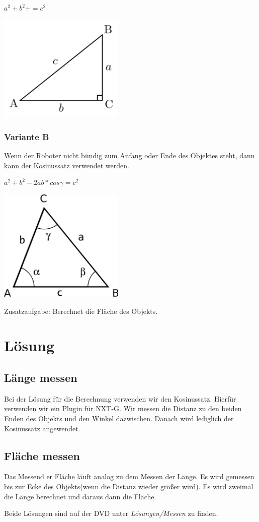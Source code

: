 $a^2 + b^2 + = c^2$

\begin{capfigure}[Pythagoras]
	\includegraphics[width=6cm]{images/pythagoras.png}
\end{capfigure}

\clearpage
\subsubsection{Variante B}
Wenn der Roboter nicht bündig zum Anfang oder Ende des Objektes steht, dann kann der Kosinussatz verwendet werden.

$a^2 + b^2 - 2ab*cos\gamma = c^2$

\begin{capfigure}[Kosinussatz]
	\includegraphics[width=6cm]{images/kosinus.png}
\end{capfigure}

Zusatzaufgabe: Berechnet die Fläche des Objekts.

\section{Lösung}
\subsection{Länge messen}
Bei der Lösung für die Berechnung verwenden wir den Kosinussatz. Hierfür verwenden wir ein Plugin für NXT-G. Wir messen die Distanz zu den beiden Enden des Objekts und den Winkel dazwischen. Danach wird lediglich der Kosinussatz angewendet.

\subsection{Fläche messen}
Das Messend er Fläche läuft analog zu dem Messen der Länge. Es wird gemessen bis zur Ecke des Objekts(wenn die Distanz wieder größer wird). Es wird zweimal die Länge berechnet und daraus dann die Fläche.

Beide Lösungen sind auf der DVD unter \textit{Lösungen/Messen} zu finden.